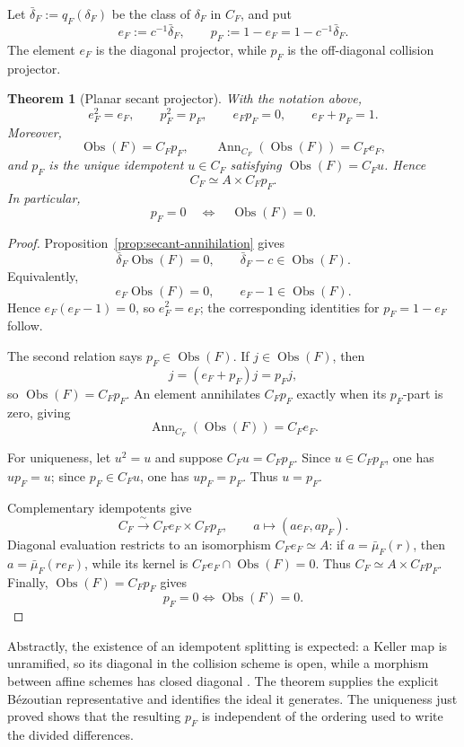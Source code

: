 \documentclass[11pt]{article}
\newtheorem{theorem}{Theorem}[section]
\newcommand{\Obs}{\operatorname{Obs}}
\begin{document}
Let \(\bar\delta_F:=q_F(\delta_F)\) be the class of \(\delta_F\) in
\(C_F\), and put
\[
  e_F:=c^{-1}\bar\delta_F,\qquad
  p_F:=1-e_F=1-c^{-1}\bar\delta_F.
\]
The element \(e_F\) is the diagonal projector, while \(p_F\) is the
off-diagonal collision projector.

\begin{theorem}[Planar secant projector]
\label{thm:planar-secant-projector}
With the notation above,
\[
  e_F^2=e_F,\qquad
  p_F^2=p_F,\qquad
  e_Fp_F=0,\qquad
  e_F+p_F=1.
\]
Moreover,
\[
  \Obs(F)=C_Fp_F,\qquad
  \operatorname{Ann}_{C_F}(\Obs(F))=C_Fe_F,
\]
and \(p_F\) is the unique idempotent \(u\in C_F\) satisfying
\(\Obs(F)=C_Fu\).  Hence
\[
  C_F\simeq A\times C_Fp_F.
\]
In particular,
\[
  p_F=0\quad\Longleftrightarrow\quad\Obs(F)=0.
\]
\end{theorem}

\begin{proof}
Proposition~\ref{prop:secant-annihilation} gives
\[
  \bar\delta_F\Obs(F)=0,\qquad
  \bar\delta_F-c\in\Obs(F).
\]
Equivalently,
\[
  e_F\Obs(F)=0,\qquad e_F-1\in\Obs(F).
\]
Hence \(e_F(e_F-1)=0\), so \(e_F^2=e_F\); the corresponding identities
for \(p_F=1-e_F\) follow.

The second relation says \(p_F\in\Obs(F)\).  If
\(j\in\Obs(F)\), then
\[
  j=(e_F+p_F)j=p_Fj,
\]
so \(\Obs(F)=C_Fp_F\).  An element annihilates \(C_Fp_F\) exactly when its
\(p_F\)-part is zero, giving
\[
  \operatorname{Ann}_{C_F}(\Obs(F))=C_Fe_F.
\]

For uniqueness, let \(u^2=u\) and suppose \(C_Fu=C_Fp_F\).  Since
\(u\in C_Fp_F\), one has \(up_F=u\); since \(p_F\in C_Fu\), one has
\(up_F=p_F\).  Thus \(u=p_F\).

Complementary idempotents give
\[
  C_F\xrightarrow{\ \sim\ }C_Fe_F\times C_Fp_F,\qquad
  a\longmapsto(ae_F,ap_F).
\]
Diagonal evaluation restricts to an isomorphism \(C_Fe_F\simeq A\):
if \(a=\bar\mu_F(r)\), then \(a=\bar\mu_F(re_F)\), while its kernel is
\(C_Fe_F\cap\Obs(F)=0\).  Thus \(C_F\simeq A\times C_Fp_F\).
Finally, \(\Obs(F)=C_Fp_F\) gives
\[
  p_F=0\Longleftrightarrow\Obs(F)=0.
\]
\end{proof}

Abstractly, the existence of an idempotent splitting is expected: a Keller
map is unramified, so its diagonal in the collision scheme is open, while a
morphism between affine schemes has closed diagonal
\cite{StacksUnramifiedDiagonalOpen,StacksAffineDiagonalClosed}.  The theorem
supplies the explicit B\'ezoutian representative and identifies the ideal it
generates.  The uniqueness just proved shows that the resulting \(p_F\) is
independent of the ordering used to write the divided differences.
\end{document}
